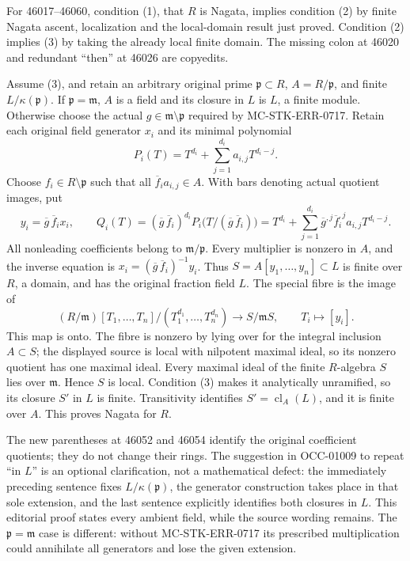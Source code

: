 For 46017--46060, condition (1), that \(R\) is Nagata, implies condition (2) by finite Nagata ascent, localization and the local-domain result just proved. Condition (2) implies (3) by taking the already local finite domain. The missing colon at 46020 and redundant ``then'' at 46026 are copyedits.

Assume (3), and retain an arbitrary original prime \(\mathfrak p\subset R\), \(A=R/\mathfrak p\), and finite \(L/\kappa(\mathfrak p)\). If \(\mathfrak p=\mathfrak m\), \(A\) is a field and its closure in \(L\) is \(L\), a finite module. Otherwise choose the actual \(g\in\mathfrak m\setminus\mathfrak p\) required by MC-STK-ERR-0717. Retain each original field generator \(x_i\) and its minimal polynomial \[
 P_i(T)=T^{d_i}+\sum_{j=1}^{d_i}a_{i,j}T^{d_i-j}.
\] Choose \(f_i\in R\setminus\mathfrak p\) such that all \(\overline f_i a_{i,j}\in A\). With bars denoting actual quotient images, put \[
 y_i=\overline g\,\overline f_i x_i,\qquad
 Q_i(T)=(\overline g\,\overline f_i)^{d_i}
 P_i\bigl(T/(\overline g\,\overline f_i)\bigr)
 =T^{d_i}+\sum_{j=1}^{d_i}
   \overline g^{,j}\overline f_i^{,j}a_{i,j}T^{d_i-j}.
\] All nonleading coefficients belong to \(\mathfrak m/\mathfrak p\). Every multiplier is nonzero in \(A\), and the inverse equation is \(x_i=(\overline g\,\overline f_i)^{-1}y_i\). Thus \(S=A[y_1,\ldots,y_n]\subset L\) is finite over \(R\), a domain, and has the original fraction field \(L\). The special fibre is the image of \[
 (R/\mathfrak m)[T_1,\ldots,T_n]/(T_1^{d_1},\ldots,T_n^{d_n})
 \longrightarrow S/\mathfrak mS,
 \qquad T_i\longmapsto[y_i].
\] This map is onto. The fibre is nonzero by lying over for the integral inclusion \(A\subset S\); the displayed source is local with nilpotent maximal ideal, so its nonzero quotient has one maximal ideal. Every maximal ideal of the finite \(R\)-algebra \(S\) lies over \(\mathfrak m\). Hence \(S\) is local. Condition (3) makes it analytically unramified, so its closure \(S'\) in \(L\) is finite. Transitivity identifies \(S'=\operatorname{cl}_A(L)\), and it is finite over \(A\). This proves Nagata for \(R\).

The new parentheses at 46052 and 46054 identify the original coefficient quotients; they do not change their rings. The suggestion in OCC-01009 to repeat ``in \(L\)'' is an optional clarification, not a mathematical defect: the immediately preceding sentence fixes \(L/\kappa(\mathfrak p)\), the generator construction takes place in that sole extension, and the last sentence explicitly identifies both closures in \(L\). This editorial proof states every ambient field, while the source wording remains. The \(\mathfrak p=\mathfrak m\) case is different: without MC-STK-ERR-0717 its prescribed multiplication could annihilate all generators and lose the given extension.

